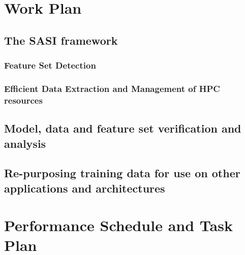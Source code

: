 \section{Work Plan} 
\label{sec:approach}

\subsection{ The SASI framework }

\subsubsection{Feature Set Detection}


\subsubsection{ Efficient Data Extraction and Management of HPC resources } 


\subsection{ Model, data and feature set verification and analysis } 


\subsection{ Re-purposing training data for use on other applications and architectures }



\section{Performance Schedule and Task Plan}
\label{sec:taskplan}

